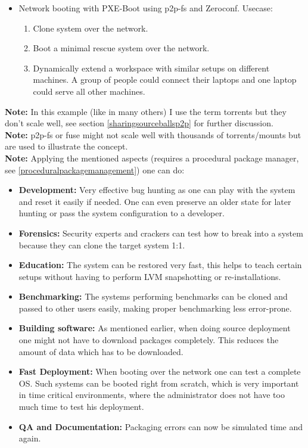 \documentclass[a4paper,10pt]{article}
\begin{document}
\begin{itemize}
\item Network booting with PXE-Boot using p2p-fs and Zeroconf. Usecase:
      \begin{enumerate}
       \item Clone system over the network.
       \item Boot a minimal rescue system over the network.
       \item Dynamically extend a workspace with similar setups on different machines. A group of people could connect their laptops and one laptop could serve all other machines.
      \end{enumerate}
\end{itemize}

\textbf{Note:} In this example (like in many others) I use the term torrents but they don't scale well, see section \ref{sharingsourceballsp2p} for further discussion.\\

\textbf{Note:} p2p-fs or fuse might not scale well with thousands of torrents/mounts but are used to illustrate the concept. \\

\textbf{Note:} Applying the mentioned aspects (requires a procedural package manager, see \ref{proceduralpackagemanagement}) one can do:
\begin{itemize}
\item \textbf{Development:} Very effective bug hunting as one can play with the system and reset it easily if needed. One can even preserve an older state for later hunting or pass the system configuration to a developer.
\item \textbf{Forensics:} Security experts and crackers can test how to break into a system because they can clone the target system 1:1.
\item \textbf{Education:} The system can be restored very fast, this helps to teach certain setups without having to perform LVM snapshotting or re-installations.
\item \textbf{Benchmarking:} The systems performing benchmarks can be cloned and passed to other users easily, making proper benchmarking less error-prone.
\item \textbf{Building software:} As mentioned earlier, when doing source deployment one might not have to download packages completely. This reduces the amount of data which has to be downloaded.
\item \textbf{Fast Deployment:} When booting over the network one can test a complete OS. Such systems can be booted right from scratch, which is very important in time critical environments, where the administrator does not have too much time to test his deployment.
\item \textbf{QA and Documentation:} Packaging errors can now be simulated time and again.
\end{itemize}
\end{document}
